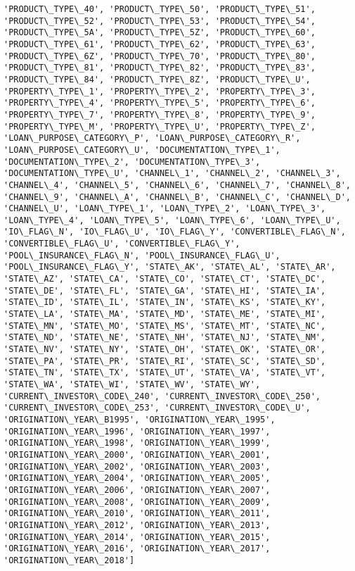\documentclass[11pt]{article}
\begin{document}
\begin{Verbatim}[commandchars=\\\{\}]
'PRODUCT\_TYPE\_40', 'PRODUCT\_TYPE\_50', 'PRODUCT\_TYPE\_51', 'PRODUCT\_TYPE\_52', 'PRODUCT\_TYPE\_53', 'PRODUCT\_TYPE\_54', 'PRODUCT\_TYPE\_5A', 'PRODUCT\_TYPE\_5Z', 'PRODUCT\_TYPE\_60', 'PRODUCT\_TYPE\_61', 'PRODUCT\_TYPE\_62', 'PRODUCT\_TYPE\_63', 'PRODUCT\_TYPE\_6Z', 'PRODUCT\_TYPE\_70', 'PRODUCT\_TYPE\_80', 'PRODUCT\_TYPE\_81', 'PRODUCT\_TYPE\_82', 'PRODUCT\_TYPE\_83', 'PRODUCT\_TYPE\_84', 'PRODUCT\_TYPE\_8Z', 'PRODUCT\_TYPE\_U', 'PROPERTY\_TYPE\_1', 'PROPERTY\_TYPE\_2', 'PROPERTY\_TYPE\_3', 'PROPERTY\_TYPE\_4', 'PROPERTY\_TYPE\_5', 'PROPERTY\_TYPE\_6', 'PROPERTY\_TYPE\_7', 'PROPERTY\_TYPE\_8', 'PROPERTY\_TYPE\_9', 'PROPERTY\_TYPE\_M', 'PROPERTY\_TYPE\_U', 'PROPERTY\_TYPE\_Z', 'LOAN\_PURPOSE\_CATEGORY\_P', 'LOAN\_PURPOSE\_CATEGORY\_R', 'LOAN\_PURPOSE\_CATEGORY\_U', 'DOCUMENTATION\_TYPE\_1', 'DOCUMENTATION\_TYPE\_2', 'DOCUMENTATION\_TYPE\_3', 'DOCUMENTATION\_TYPE\_U', 'CHANNEL\_1', 'CHANNEL\_2', 'CHANNEL\_3', 'CHANNEL\_4', 'CHANNEL\_5', 'CHANNEL\_6', 'CHANNEL\_7', 'CHANNEL\_8', 'CHANNEL\_9', 'CHANNEL\_A', 'CHANNEL\_B', 'CHANNEL\_C', 'CHANNEL\_D', 'CHANNEL\_U', 'LOAN\_TYPE\_1', 'LOAN\_TYPE\_2', 'LOAN\_TYPE\_3', 'LOAN\_TYPE\_4', 'LOAN\_TYPE\_5', 'LOAN\_TYPE\_6', 'LOAN\_TYPE\_U', 'IO\_FLAG\_N', 'IO\_FLAG\_U', 'IO\_FLAG\_Y', 'CONVERTIBLE\_FLAG\_N', 'CONVERTIBLE\_FLAG\_U', 'CONVERTIBLE\_FLAG\_Y', 'POOL\_INSURANCE\_FLAG\_N', 'POOL\_INSURANCE\_FLAG\_U', 'POOL\_INSURANCE\_FLAG\_Y', 'STATE\_AK', 'STATE\_AL', 'STATE\_AR', 'STATE\_AZ', 'STATE\_CA', 'STATE\_CO', 'STATE\_CT', 'STATE\_DC', 'STATE\_DE', 'STATE\_FL', 'STATE\_GA', 'STATE\_HI', 'STATE\_IA', 'STATE\_ID', 'STATE\_IL', 'STATE\_IN', 'STATE\_KS', 'STATE\_KY', 'STATE\_LA', 'STATE\_MA', 'STATE\_MD', 'STATE\_ME', 'STATE\_MI', 'STATE\_MN', 'STATE\_MO', 'STATE\_MS', 'STATE\_MT', 'STATE\_NC', 'STATE\_ND', 'STATE\_NE', 'STATE\_NH', 'STATE\_NJ', 'STATE\_NM', 'STATE\_NV', 'STATE\_NY', 'STATE\_OH', 'STATE\_OK', 'STATE\_OR', 'STATE\_PA', 'STATE\_PR', 'STATE\_RI', 'STATE\_SC', 'STATE\_SD', 'STATE\_TN', 'STATE\_TX', 'STATE\_UT', 'STATE\_VA', 'STATE\_VT', 'STATE\_WA', 'STATE\_WI', 'STATE\_WV', 'STATE\_WY', 'CURRENT\_INVESTOR\_CODE\_240', 'CURRENT\_INVESTOR\_CODE\_250', 'CURRENT\_INVESTOR\_CODE\_253', 'CURRENT\_INVESTOR\_CODE\_U', 'ORIGINATION\_YEAR\_B1995', 'ORIGINATION\_YEAR\_1995', 'ORIGINATION\_YEAR\_1996', 'ORIGINATION\_YEAR\_1997', 'ORIGINATION\_YEAR\_1998', 'ORIGINATION\_YEAR\_1999', 'ORIGINATION\_YEAR\_2000', 'ORIGINATION\_YEAR\_2001', 'ORIGINATION\_YEAR\_2002', 'ORIGINATION\_YEAR\_2003', 'ORIGINATION\_YEAR\_2004', 'ORIGINATION\_YEAR\_2005', 'ORIGINATION\_YEAR\_2006', 'ORIGINATION\_YEAR\_2007', 'ORIGINATION\_YEAR\_2008', 'ORIGINATION\_YEAR\_2009', 'ORIGINATION\_YEAR\_2010', 'ORIGINATION\_YEAR\_2011', 'ORIGINATION\_YEAR\_2012', 'ORIGINATION\_YEAR\_2013', 'ORIGINATION\_YEAR\_2014', 'ORIGINATION\_YEAR\_2015', 'ORIGINATION\_YEAR\_2016', 'ORIGINATION\_YEAR\_2017', 'ORIGINATION\_YEAR\_2018']

    \end{Verbatim}
\end{document}

